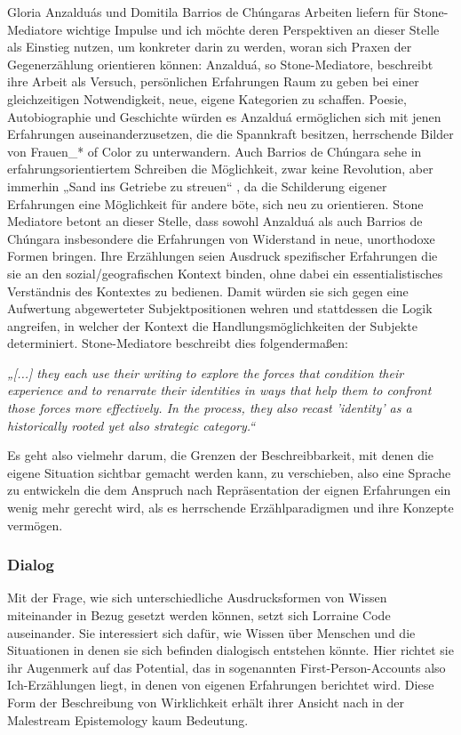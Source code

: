 Gloria Anzalduás und Domitila Barrios de Chúngaras Arbeiten liefern für
Stone-Mediatore wichtige Impulse und ich möchte deren Perspektiven an dieser
Stelle als Einstieg nutzen, um konkreter darin zu werden, woran sich Praxen der
Gegenerzählung orientieren können: Anzalduá, so Stone-Mediatore, beschreibt
ihre Arbeit als Versuch, persönlichen Erfahrungen Raum zu geben bei einer
gleichzeitigen Notwendigkeit, neue, eigene Kategorien zu schaffen. Poesie,
Autobiographie und Geschichte würden es Anzalduá ermöglichen sich mit jenen
Erfahrungen auseinanderzusetzen, die die Spannkraft besitzen, herrschende
Bilder von Frauen\_* of Color zu unterwandern.\footnotemark {} Auch Barrios de Chúngara sehe in
erfahrungsorientiertem Schreiben die Möglichkeit, zwar keine Revolution, aber
immerhin „Sand ins Getriebe zu streuen“ \footnotemark {}, da die Schilderung eigener
Erfahrungen eine Möglichkeit für andere böte, sich neu zu orientieren. Stone
Mediatore betont an dieser Stelle, dass sowohl Anzalduá als auch Barrios de
Chúngara insbesondere die Erfahrungen von Widerstand in neue, unorthodoxe
Formen bringen. Ihre Erzählungen seien Ausdruck spezifischer Erfahrungen die
sie an den sozial/geografischen Kontext binden, ohne dabei ein
essentialistisches Verständnis des Kontextes zu bedienen. Damit würden sie sich
gegen eine Aufwertung abgewerteter Subjektpositionen wehren und stattdessen die
Logik angreifen, in welcher der Kontext die Handlungsmöglichkeiten der Subjekte
determiniert.\footnotemark {} Stone-Mediatore beschreibt dies folgendermaßen:
\begin{myenv}
    \textit{„[...] they each use their writing to explore the forces that
    condition their experience and to renarrate their identities in ways that
  help them to confront those forces more effectively. In the process, they
also recast 'identity' as a historically rooted yet also strategic
category.“\footnotemark {}}
\end{myenv}

Es geht also vielmehr darum, die Grenzen der Beschreibbarkeit, mit denen die
eigene Situation sichtbar gemacht werden kann, zu verschieben, also eine
Sprache zu entwickeln die dem Anspruch nach Repräsentation der eignen
Erfahrungen ein wenig mehr gerecht wird, als es herrschende Erzählparadigmen
und ihre Konzepte vermögen.
\subsubsection{Dialog}

Mit der Frage, wie sich unterschiedliche Ausdrucksformen von Wissen miteinander in Bezug gesetzt werden können, setzt sich Lorraine Code auseinander. Sie interessiert sich dafür,  wie Wissen über Menschen und die  Situationen in denen sie sich befinden dialogisch entstehen könnte. Hier richtet sie ihr Augenmerk auf das Potential, das in sogenannten First-Person-Accounts also Ich-Erzählungen liegt, in denen von eigenen Erfahrungen berichtet wird. Diese Form der Beschreibung von Wirklichkeit erhält ihrer Ansicht nach in der Malestream Epistemology kaum Bedeutung.
